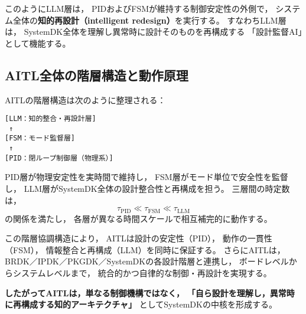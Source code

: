 このようにLLM層は，
PIDおよびFSMが維持する制御安定性の外側で，
システム全体の\textbf{知的再設計（intelligent redesign）}を実行する。
すなわちLLM層は，
SystemDK全体を理解し異常時に設計そのものを再構成する
「設計監督AI」として機能する。

\subsection{AITL全体の階層構造と動作原理}
AITLの階層構造は次のように整理される：

\begin{center}
\texttt{[LLM：知的整合・再設計層]}\\
\texttt{     ↑}\\
\texttt{[FSM：モード監督層]}\\
\texttt{     ↑}\\
\texttt{[PID：閉ループ制御層（物理系）]}
\end{center}

PID層が物理安定性を実時間で維持し，
FSM層がモード単位で安全性を監督し，
LLM層がSystemDK全体の設計整合性と再構成を担う。
三層間の時定数は，
\[
\tau_{\mathrm{PID}} \ll \tau_{\mathrm{FSM}} \ll \tau_{\mathrm{LLM}}
\]
の関係を満たし，
各層が異なる時間スケールで相互補完的に動作する。

この階層協調構造により，
AITLは設計の安定性（PID），
動作の一貫性（FSM），
情報整合と再構成（LLM）を同時に保証する。
さらにAITLは，
BRDK／IPDK／PKGDK／SystemDKの各設計階層と連携し，
ボードレベルからシステムレベルまで，
統合的かつ自律的な制御・再設計を実現する。

\textbf{したがってAITLは，単なる制御機構ではなく，}
\textbf{「自ら設計を理解し，異常時に再構成する知的アーキテクチャ」}
としてSystemDKの中核を形成する。
